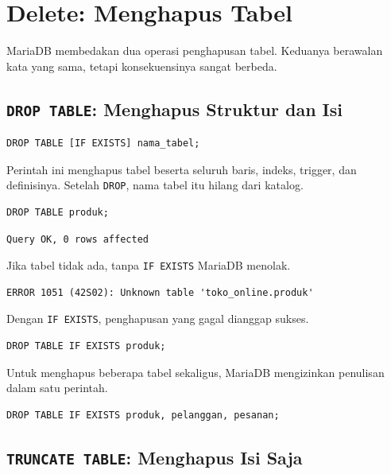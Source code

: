 \documentclass[11pt,a4paper]{article}
\begin{document}
\section{Delete: Menghapus Tabel}

MariaDB membedakan dua operasi penghapusan tabel. Keduanya berawalan kata yang sama, tetapi konsekuensinya sangat berbeda.

\subsection{\texttt{DROP TABLE}: Menghapus Struktur dan Isi}

\begin{lstlisting}[style=code]
DROP TABLE [IF EXISTS] nama_tabel;
\end{lstlisting}

Perintah ini menghapus tabel beserta seluruh baris, indeks, trigger, dan definisinya. Setelah \texttt{DROP}, nama tabel itu hilang dari katalog.

\begin{lstlisting}[style=code]
DROP TABLE produk;
\end{lstlisting}

\begin{lstlisting}[style=out]
Query OK, 0 rows affected
\end{lstlisting}

Jika tabel tidak ada, tanpa \texttt{IF EXISTS} MariaDB menolak.

\begin{lstlisting}[style=out]
ERROR 1051 (42S02): Unknown table 'toko_online.produk'
\end{lstlisting}

Dengan \texttt{IF EXISTS}, penghapusan yang gagal dianggap sukses.

\begin{lstlisting}[style=code]
DROP TABLE IF EXISTS produk;
\end{lstlisting}

Untuk menghapus beberapa tabel sekaligus, MariaDB mengizinkan penulisan dalam satu perintah.

\begin{lstlisting}[style=code]
DROP TABLE IF EXISTS produk, pelanggan, pesanan;
\end{lstlisting}

\subsection{\texttt{TRUNCATE TABLE}: Menghapus Isi Saja}
\end{document}
